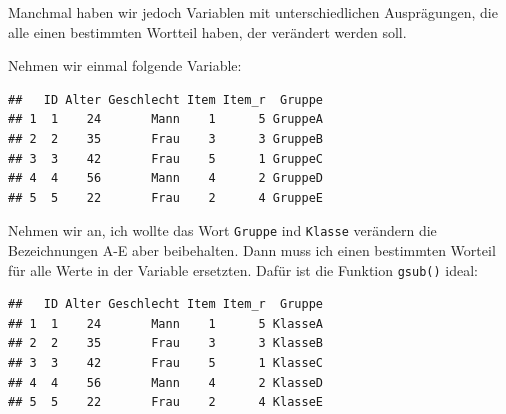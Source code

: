 \documentclass[
]{book}
\newenvironment{Shaded}{\begin{snugshade}}{\end{snugshade}}
\newcommand{\AttributeTok}[1]{\textcolor[rgb]{0.13,0.29,0.53}{#1}}
\newcommand{\FunctionTok}[1]{\textcolor[rgb]{0.13,0.29,0.53}{\textbf{#1}}}
\newcommand{\NormalTok}[1]{#1}
\newcommand{\OtherTok}[1]{\textcolor[rgb]{0.56,0.35,0.01}{#1}}
\newcommand{\SpecialCharTok}[1]{\textcolor[rgb]{0.81,0.36,0.00}{\textbf{#1}}}
\newcommand{\StringTok}[1]{\textcolor[rgb]{0.31,0.60,0.02}{#1}}
\begin{document}
Manchmal haben wir jedoch Variablen mit unterschiedlichen Ausprägungen, die alle einen bestimmten Wortteil haben, der verändert werden soll.

Nehmen wir einmal folgende Variable:

\begin{Shaded}
\end{Shaded}

\begin{verbatim}
##   ID Alter Geschlecht Item Item_r  Gruppe
## 1  1    24       Mann    1      5 GruppeA
## 2  2    35       Frau    3      3 GruppeB
## 3  3    42       Frau    5      1 GruppeC
## 4  4    56       Mann    4      2 GruppeD
## 5  5    22       Frau    2      4 GruppeE
\end{verbatim}

Nehmen wir an, ich wollte das Wort \texttt{Gruppe} ind \texttt{Klasse} verändern die Bezeichnungen A-E aber beibehalten. Dann muss ich einen bestimmten Worteil für alle Werte in der Variable ersetzten. Dafür ist die Funktion \texttt{gsub()} ideal:

\begin{Shaded}
\end{Shaded}

\begin{verbatim}
##   ID Alter Geschlecht Item Item_r  Gruppe
## 1  1    24       Mann    1      5 KlasseA
## 2  2    35       Frau    3      3 KlasseB
## 3  3    42       Frau    5      1 KlasseC
## 4  4    56       Mann    4      2 KlasseD
## 5  5    22       Frau    2      4 KlasseE
\end{verbatim}
\end{document}
